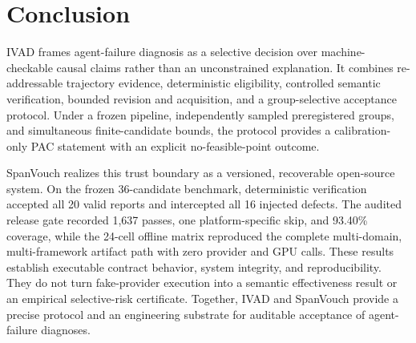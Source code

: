 \section{Conclusion}
\label{sec:conclusion}

IVAD frames agent-failure diagnosis as a selective decision over
machine-checkable causal claims rather than an unconstrained explanation. It
combines re-addressable trajectory evidence, deterministic eligibility,
controlled semantic verification, bounded revision and acquisition, and a
group-selective acceptance protocol. Under a frozen pipeline, independently
sampled preregistered groups, and simultaneous finite-candidate bounds, the
protocol provides a calibration-only PAC statement with an explicit
no-feasible-point outcome.

SpanVouch realizes this trust boundary as a versioned, recoverable open-source
system. On the frozen 36-candidate benchmark, deterministic verification
accepted all 20 valid reports and intercepted all 16 injected defects. The
audited release gate recorded 1,637 passes, one platform-specific skip, and
93.40\% coverage, while the 24-cell offline matrix reproduced the complete
multi-domain, multi-framework artifact path with zero provider and GPU calls.
These results establish executable contract behavior, system integrity, and
reproducibility. They do not turn fake-provider execution into a semantic
effectiveness result or an empirical selective-risk certificate. Together,
IVAD and SpanVouch provide a precise protocol and an engineering substrate for
auditable acceptance of agent-failure diagnoses.
